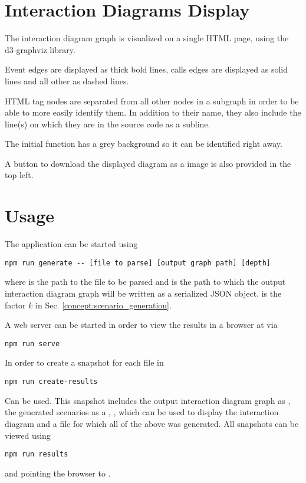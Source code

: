 \section{Interaction Diagrams Display}
The interaction diagram graph is visualized on a single HTML page, using the d3-graphviz \parencite{graph_viz} library. 

Event edges are displayed as thick bold lines, calls edges are displayed as solid lines and all other as dashed lines.

HTML tag nodes are separated from all other nodes in a subgraph in order to be able to more easily identify them. In addition to their name, they also include the line(s) on which they are in the source code as a subline.

The initial function has a grey background so it can be identified right away.

A button to download the displayed diagram as a  image is also provided in the top left.

\section{Usage}
The application can be started using
\begin{lstlisting}[style=bash]
npm run generate -- [file to parse] [output graph path] [depth]
\end{lstlisting}
where  is the path to the  file to be parsed and  is the path to which the output interaction diagram graph will be written as a serialized JSON object.  is the factor $k$ in Sec. \ref{concept:scenario_generation}.

A web server can be started in order to view the results in a browser at  via
\begin{lstlisting}[style=bash]
npm run serve
\end{lstlisting}

In order to create a snapshot for each file in 
\begin{lstlisting}[style=bash]
npm run create-results  
\end{lstlisting}
Can be used. This snapshot includes the output interaction diagram graph as , the generated scenarios as a , , which can be used to display the interaction diagram and a  file for which all of the above was generated. All snapshots can be viewed using
\begin{lstlisting}[style=bash]
npm run results 
\end{lstlisting}
and pointing the browser to .
